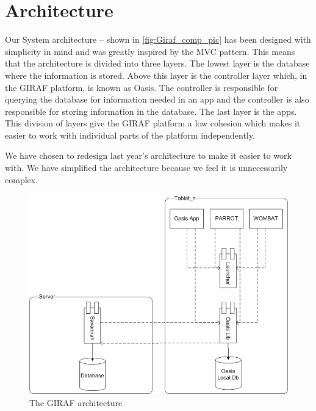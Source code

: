\section{Architecture}
Our System architecture -- shown in \autoref{fig:Giraf_comp_pic} has been designed with simplicity in mind and was greatly inspired by the MVC pattern. This means that the architecture is divided into three layers. The lowest layer is the database where the information is stored. Above this layer is the controller layer which, in the GIRAF platform, is known as Oasis. The controller is responsible for querying the database for information needed in an app and the controller is also responsible for storing information in the database. The last layer is the apps. This division of layers give the GIRAF platform a low cohesion which makes it easier to work with individual parts of the platform independently.

We have chosen to redesign last year's architecture \cite{LastYearsArchitecture} to make it easier to work with. We have simplified the architecture because we feel it is unnecessarily complex.

\begin{figure}
	\centering
		\includegraphics[width=\textwidth]{Images/Giraf_comp.png}
	\caption{The GIRAF architecture}
	\label{fig:Giraf_comp_pic}
\end{figure}

